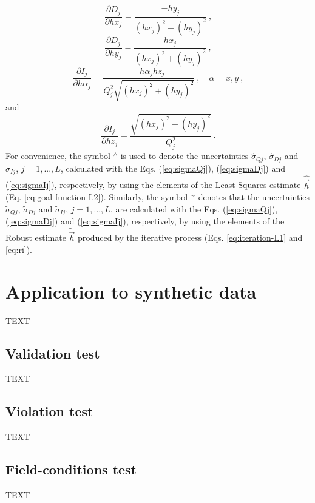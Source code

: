 \documentclass[journal abbreviation, npg]{copernicus}
\begin{document}
\begin{equation}
\frac{\partial D_{j}}{\partial hx_{j}} = \dfrac{- hy_{j}}{ \left( hx_{j} \right)^{2} + \left( hy_{j} \right)^{2}} \: ,
\label{eq:dDj-dhxj}
\end{equation}
\begin{equation}
\frac{\partial D_{j}}{\partial hy_{j}} = \dfrac{ hx_{j} }{ \left( hx_{j} \right)^{2} + \left( hy_{j} \right)^{2}} \: ,
\label{eq:dDj-dhyj}
\end{equation}
\begin{equation}
\frac{\partial I_{j}}{\partial h \alpha_{j}} = \dfrac{-h \alpha_{j} hz_{j}}{Q_{j}^{2} \sqrt{\left( hx_{j} \right)^{2} + \left( hy_{j} \right)^{2}}} \: , \quad \alpha = x, y \: ,
\label{eq:dIj-dhalphaj}
\end{equation}
and
\begin{equation}
\frac{\partial I_{j}}{\partial hz_{j}} = \dfrac{ \sqrt{\left( hx_{j} \right)^{2} + \left( hy_{j} \right)^{2}} }{Q_{j}^{2}} \: .
\label{eq:dIj-dhzj}
\end{equation}
For convenience, the symbol $^\wedge$ is used to denote the uncertainties $\hat{\sigma}_{Qj}$, $\hat{\sigma}_{Dj}$ and $\hat{\sigma}_{Ij}$, $j = 1, ..., L$, calculated with the Eqs. (\ref{eq:sigmaQj}), (\ref{eq:sigmaDj}) and (\ref{eq:sigmaIj}), respectively, by using the elements of the Least Squares estimate $\hat{\vec{h}}$ (Eq. \ref{eq:goal-function-L2}). Similarly, the symbol $^\sim$ denotes that the uncertainties $\tilde{\sigma}_{Qj}$, $\tilde{\sigma}_{Dj}$ and $\tilde{\sigma}_{Ij}$, $j = 1, ..., L$, are calculated with the Eqs. (\ref{eq:sigmaQj}), (\ref{eq:sigmaDj}) and (\ref{eq:sigmaIj}), respectively, by using the elements of the Robust estimate $\tilde{\vec{h}}$ produced by the iterative process (Eqs. \ref{eq:iteration-L1} and \ref{eq:ri}).

\section{Application to synthetic data}
TEXT

\subsection{Validation test}
TEXT

\subsection{Violation test}
TEXT

\subsection{Field-conditions test}
TEXT
\end{document}
